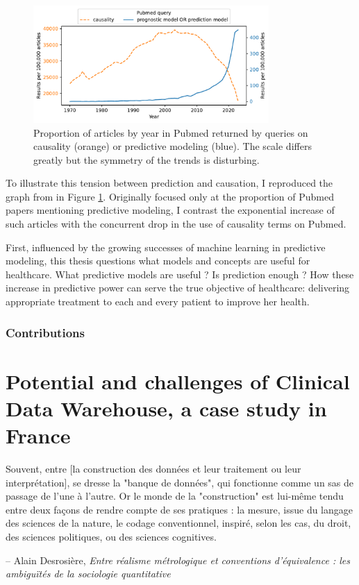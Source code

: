 \documentclass[french,12pt,twoside,a4paper]{book}
\newenvironment{citationbox}{
  \begin{tcolorbox}[
      enhanced,
      colback=gray!10, %
      colframe=white, %
      arc=0mm, %
      boxrule=0.5pt, %
      rightrule=0pt, %
      left=0pt, %
      right=0pt, %
      top=0pt, %
      bottom=0pt, %
      rightupper=0mm, %
      rightlower=0mm, %
      width=0.9\textwidth,
      flush right,
    ]
    \footnotesize %
    \itshape %
    }{
  \end{tcolorbox}%
}
\newlength{\drop}%
\begin{document}
\begin{figure}[h!]
  \includegraphics[width=0.8\textwidth]{img/chapter_1/pubmed_query.pdf}
  \caption{Proportion of articles by year in Pubmed returned by queries on
    causality (orange) or predictive modeling (blue). The scale differs greatly
    but the symmetry of the trends is disturbing.}%
  \label{fig:intro:pubmed_query}
\end{figure}

To illustrate this tension between prediction and causation, I reproduced the
graph from \citep[Chapter 1]{steyerberg2009applications} in Figure
\ref{fig:intro:pubmed_query}. Originally focused only at the proportion of
Pubmed papers mentioning predictive modeling, I contrast the exponential
increase of such articles with the concurrent drop in the use of causality terms
on Pubmed.

First, influenced by the growing successes of machine learning in predictive
modeling, this thesis questions what models and concepts are useful for
healthcare. What predictive models are useful ? Is prediction enough ? How these
increase in predictive power can serve the true objective of healthcare:
delivering appropriate treatment to each and every patient to improve her
health.

\subsection{Contributions}\label{subsec:intro:contributions}

\chapter{Potential and challenges of Clinical Data Warehouse, a case study in France}\label{chapter:cdw}


\begin{citationbox}
  Souvent, entre [la construction des données et leur traitement ou leur
      interprétation], se dresse la "banque de données", qui fonctionne comme un
  sas de passage de l'une à l'autre. Or le monde de la "construction" est
  lui-même tendu entre deux façons de rendre compte de ses pratiques : la
  mesure, issue du langage des sciences de la nature, le codage conventionnel,
  inspiré, selon les cas, du droit, des sciences politiques, ou des sciences
  cognitives.%
  \par\hfill -- Alain Desrosière, \textit{Entre réalisme métrologique et
    conventions d'équivalence : les ambiguïtés de la sociologie quantitative}
\end{citationbox}
\end{document}
